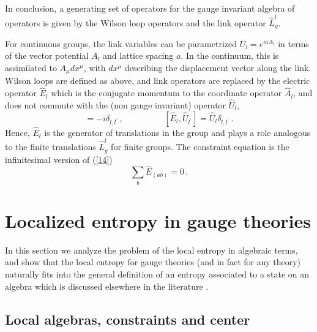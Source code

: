 \documentclass[12pt,a4paper]{article}
\newcommand{\be}{\begin{equation}}
\newcommand{\ee}{\end{equation}}
\def\be{\begin{equation}}
\def\ee{\end{equation}}
\begin{document}
In conclusion, a generating set of operators for the gauge invariant algebra of operators is given by the Wilson loop operators and the link operator $\hat{L}^l_g$.

For continuous groups, the link variables can be parametrized $U_l=e^{i a A_l}$ in terms of the vector potential $A_l$ and lattice spacing $a$. In the continuum, this is assimilated to $A_\mu dx^\mu$, with $dx^\mu$ describing the displacement vector along the link. Wilson loops are defined as above, and link operators are replaced by the electric operator $\hat{E}_l$ which is the conjugate momentum to the coordinate operator $\hat{A}_l$, and does not commute with the (non gauge invariant) operator $\hat{U}_l$, 
\be
[\hat{E}_l,\hat{A}_{l^\prime}]=- i \delta_{l,l^\prime} \,,\hspace{2cm}[\hat{E}_l,\hat{U}_{l^\prime}]=  \hat{U}_l \delta_{l,l^\prime}\,.
\ee
Hence, $\hat{E}_l$ is the generator of translations in the group and plays a role analogous to the finite translations $\hat{L}_g^l$ for finite groups. The constraint equation is the infinitesimal version of (\ref{14})
\be
\sum_{b} \hat{E}_{(ab)}=0\,.
\ee  

\section{Localized entropy in gauge theories}


In this section we analyze the problem of the local entropy in algebraic terms, 
and show that the local entropy for gauge theories (and in fact for any theory) naturally fits into the general definition of an entropy 
associated to a state on an algebra which is discussed elsewhere in the literature \cite{petz}.  

\subsection{Local algebras, constraints and center}
\end{document}
